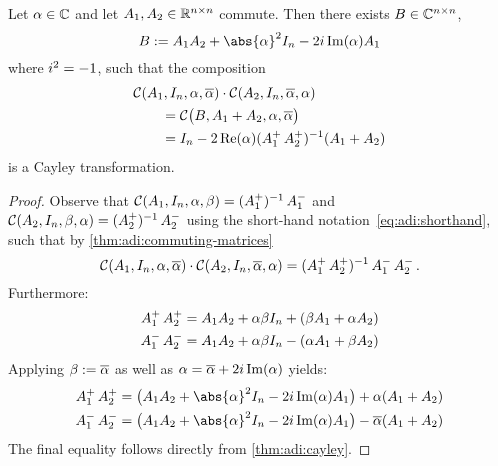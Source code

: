 \begin{lemma}
\label{thm:adi:cayley-compose}
  Let $\alpha\in\mathbb{C}$ and let $A_1, A_2 \in\mathbb{R}^{n\times n}$ commute.
  Then there exists $B\in\mathbb{C}^{n\times n}$,
  \begin{equation*}
    B := A_1A_2 + \abs{\alpha}^2 I_n - 2\im \Im(\alpha) A_1
  \end{equation*}
  where $i^2 = -1$,
  such that the composition
  \begin{align*}
    \MoveEqLeft
    \Cayley(A_1, I_n, \alpha, \conj{\alpha}) \cdot
    \Cayley(A_2, I_n, \conj{\alpha}, \alpha)
    \\
    &= \Cayley\big( B, A_1 + A_2, \alpha, \conj\alpha \big) \\
    &= I_n - 2\Re(\alpha)(\Aip\Aiip)^{-1}(A_1+A_2)
  \end{align*}
  is a Cayley transformation.
\end{lemma}
\begin{proof}
  Observe that
  $\mathcal{C}(A_1, I_n, \alpha, \beta) = \mathop{(\mathop{A_1^+})^{-1}}\mathop{A_1^-}$ and
  $\mathcal{C}(A_2, I_n, \beta, \alpha) = \mathop{(\mathop{A_2^+})^{-1}}\mathop{A_2^-}$
  using the short-hand notation~\eqref{eq:adi:shorthand},
  such that by \autoref{thm:adi:commuting-matrices}
  \begin{equation*}
    \Cayley(A_1, I_n, \alpha, \conj{\alpha})
    \cdot
    \Cayley(A_2, I_n, \conj{\alpha}, \alpha)
    =
    (\Aip\Aiip)^{-1} \Aim\Aiim
    .
  \end{equation*}
  Furthermore:
  \begin{align*}
    \mathop{A_1^+}\mathop{A_2^+} &= A_1A_2 + \alpha\beta I_n + (\beta A_1 + \alpha A_2) \\
    \mathop{A_1^-}\mathop{A_2^-} &= A_1A_2 + \alpha\beta I_n - (\alpha A_1 + \beta A_2)
  \end{align*}
  Applying $\beta := \conj\alpha$ as well as $\alpha = \conj\alpha + 2\im\Im(\alpha)$ yields:
  \begin{align*}
    \Aip\Aiip &= \big(A_1A_2 + \abs{\alpha}^2 I_n - 2\im\Im(\alpha)A_1\big) + \alpha (A_1+A_2) \\
    \Aim\Aiim &= \big(A_1A_2 + \abs{\alpha}^2 I_n - 2\im\Im(\alpha)A_1\big) - \conj\alpha (A_1+A_2)
  \end{align*}
  The final equality follows directly from \autoref{thm:adi:cayley}.
\end{proof}


